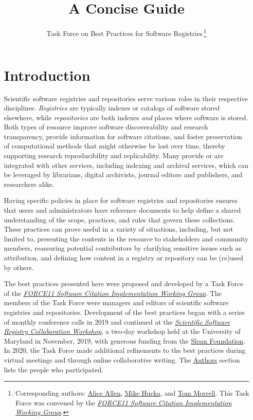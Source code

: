 \documentclass[11pt]{article}
\title{\textls[-27]{Nine Best Practices for Research Software Registries and Repositories:}\\
A Concise Guide}
\author{Task Force on Best Practices for Software Registries$\,$\footnote{Corresponding authors: \href{mailto:aallen@ascl.net}{Alice Allen}, \href{mailto:mhucka@caltech.edu}{Mike Hucka}, and \href{mailto:tmorrell@library.caltech.edu}{Tom Morrell}.\newline
This Task Force was convened by the \href{https://github.com/force11/force11-sciwg}{\emph{FORCE11 Software Citation Implementation Working Group}}.}}
\begin{document}
\maketitle
\thispagestyle{empty} %
\tableofcontents

\newcommand{\sectionbreak}{\clearpage}


\section{Introduction}
\label{introduction}

Scientific software registries and repositories serve various roles in their respective disciplines. \emph{Registries} are typically indexes or catalogs of software stored elsewhere, while \emph{repositories} are both indexes \emph{and} places where software is stored. Both types of resource improve software discoverability and research transparency, provide information for software citations, and foster preservation of computational methods that might otherwise be lost over time, thereby supporting research reproducibility and replicability. Many provide or are integrated with other services, including indexing and archival services, which can be leveraged by librarians, digital archivists, journal editors and publishers, and researchers alike.

Having specific policies in place for software registries and repositories ensures that users and administrators have reference documents to help define a shared understanding of the scope, practices, and rules that govern these collections. These practices can prove useful in a variety of situations, including, but not limited to, presenting the contents in the resource to stakeholders and community members, reassuring potential contributors by clarifying sensitive issues such as attribution, and defining how content in a registry or repository can be (re)used by others.

The best practices presented here were proposed and developed by a Task Force of the \href{https://github.com/force11/force11-sciwg}{\emph{FORCE11 Software Citation Implementation Working Group}}.  The members of the Task Force were managers and editors of scientific software registries and repositories.  Development of the best practices began with a series of monthly conference calls in 2019 and continued at the \href{https://asclnet.github.io/SWRegistryWorkshop/}{\emph{Scientific Software Registry Collaboration Workshop}}, a two-day workshop held at the University of Maryland in November, 2019, with generous funding from the \href{https://sloan.org}{Sloan Foundation}. In 2020, the Task Force made additional refinements to the best practices during virtual meetings and through online collaborative writing.  The \hyperref[authors]{Authors} section lists the people who participated.
\end{document}
